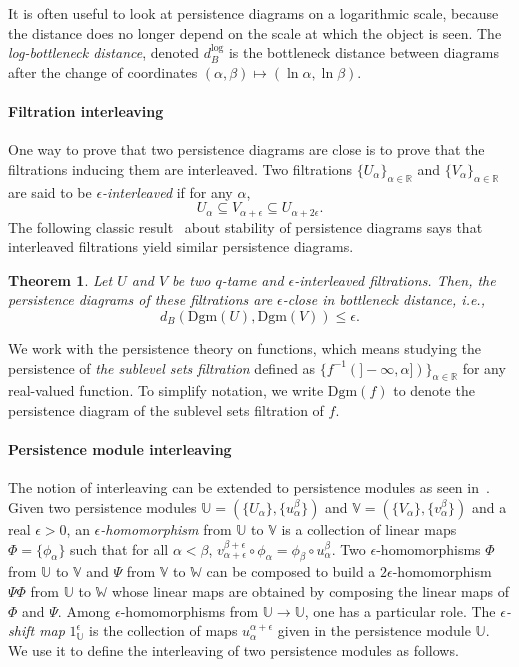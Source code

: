 \documentclass[a4paper]{article}
\newcommand\R{\mathbb{R}}
\newcommand\U{\mathbb{U}}
\newcommand\V{\mathbb{V}}
\newcommand\W{\mathbb{W}}
\newcommand\Dgm[1]{\mathrm{Dgm}(#1)}
\newcommand\dbl{d_B^{\mathrm{log}}}
\newtheorem{theorem}{Theorem}[section]
\begin{document}
  It is often useful to look at persistence diagrams on a logarithmic scale, because the distance does no longer depend on the scale at which the object is seen.
  The \emph{log-bottleneck distance}, denoted $\dbl$ is the bottleneck distance between diagrams after the change of coordinates $(\alpha,\beta)\mapsto(\ln\alpha,\ln\beta)$.

\paragraph{Filtration interleaving\\}
One way to prove that two persistence diagrams are close is to prove that the filtrations inducing them are interleaved.
Two filtrations $\{U_\alpha\}_{\alpha\in\R}$ and $\{V_\alpha\}_{\alpha\in\R}$ are said to be \emph{$\epsilon$-interleaved} if for any $\alpha$,
\[
  U_\alpha\subseteq V_{\alpha+\epsilon}\subseteq U_{\alpha+2\epsilon}.
\]
The following classic result~\cite{ppmdCCGGO,sspmCDGO,spdCEH} about stability of persistence diagrams says that interleaved filtrations yield similar persistence diagrams.

\begin{theorem}\label{tstability}
Let $U$ and $V$ be two $q$-tame and $\epsilon$-interleaved filtrations. Then, the persistence diagrams of these filtrations are $\epsilon$-close in bottleneck distance, i.e.,
\[
  d_B(\Dgm{U},\Dgm{V})\leq\epsilon.
\]
\end{theorem}


We work with the persistence theory on functions, which means studying the persistence of \emph{the sublevel sets filtration} defined as $\{f^{-1}(]-\infty,\alpha])\}_{\alpha\in\R}$ for any real-valued function.
To simplify notation, we write $\Dgm f$ to denote the persistence diagram of the sublevel sets filtration of $f$.

\paragraph{Persistence module interleaving\\}
The notion of interleaving can be extended to persistence modules as seen in~\cite{psgcCDO}.
Given two persistence modules $\U=(\{U_\alpha\},\{u_\alpha^\beta\})$ and $\V=(\{V_\alpha\},\{v_\alpha^\beta\})$ and a real $\epsilon>0$, an \emph{$\epsilon$-homomorphism} from $\U$ to $\V$ is a collection of linear maps $\Phi=\{\phi_\alpha\}$ such that for all $\alpha<\beta$, $v_{\alpha+\epsilon}^{\beta+\epsilon}\circ\phi_\alpha=\phi_\beta\circ u_{\alpha}^\beta$. 
Two $\epsilon$-homomorphisms $\Phi$ from $\U$ to $\V$ and $\Psi$ from $\V$ to $\W$ can be composed to build a $2\epsilon$-homomorphism $\Psi\Phi$ from $\U$ to $\W$ whose linear maps are obtained by composing the linear maps of $\Phi$ and $\Psi$.
Among $\epsilon$-homomorphisms from $\U\to\U$, one has a particular role.
The \emph{$\epsilon$-shift map} $1_\U^{\epsilon}$ is the collection of maps $u_\alpha^{\alpha+\epsilon}$ given in the persistence module $\U$.
We use it to define the interleaving of two persistence modules as follows.
\end{document}
